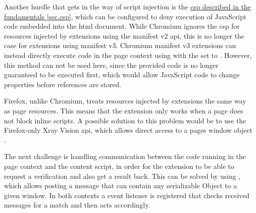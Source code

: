 



Another hurdle that gets in the way of script injection is the \hyperref[sec.csp]{\ac{csp} described in the fundamentals \autoref{sec.csp}}, which can be configured to deny execution of JavaScript code embedded into the \acs{html} document. While Chromium ignores the \ac{csp} for resources injected by extensions using the manifest v2 \acs{api}, this is no longer the case for extensions using manifest v3. Chromium manifest v3 extensions can instead directly execute code in the page context using  with the  set to . However, this method can not be used here, since the provided code is no longer guaranteed to be executed first, which would allow JavaScript code to change properties before references are stored.

Firefox, unlike Chromium, treats resources injected by extensions the same way as page resources. This means that the extension only works when a page does not block inline scripts. A possible solution to this problem would be to use the Firefox-only Xray Vision \acs{api}, which allows direct access to a pages window object \cite{XrayVisionDocs}.

The next challenge is handling communication between the code running in the page context and the content script, in order for the extension to be able to request a verification and also get a result back. This can be solved by using , which allows posting a message that can contain any serializable Object to a given window. In both contexts a  event listener is registered that checks received messages for a match and then acts accordingly.


